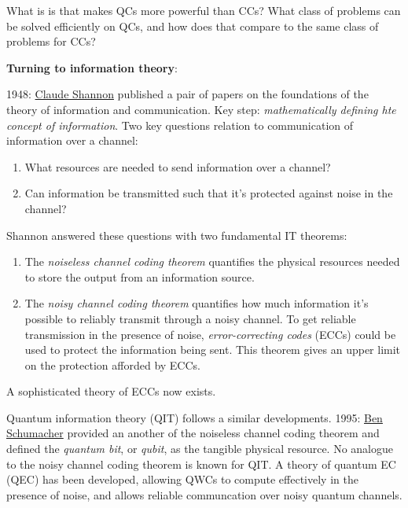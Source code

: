\documentclass{article}
\begin{document}
What is is that makes QCs more powerful than CCs? What class of problems can be solved efficiently on QCs, and how does that compare to the same class of problems for CCs?

\textbf{Turning to information theory}:

1948: \href{https://en.wikipedia.org/wiki/Claude_Shannon}{Claude Shannon} published a pair of papers on the foundations of the theory of information and communication. Key step: \textit{mathematically defining hte concept of information}. Two key questions relation to communication of information over a channel:

\begin{enumerate}
\item What resources are needed to send information over a channel?
\item Can information be transmitted such that it's protected against noise in the channel?
\end{enumerate}

Shannon answered these questions with two fundamental IT theorems:

\begin{enumerate}
\item The \textit{noiseless channel coding theorem} quantifies the physical resources needed to store the output from an information source.
\item The \textit{noisy channel coding theorem} quantifies how much information it's possible to reliably transmit through a noisy channel. To get reliable transmission in the presence of noise, \textit{error-correcting codes} (ECCs) could be used to protect the information being sent. This theorem gives an upper limit on the protection afforded by ECCs.
\end{enumerate}

A sophisticated theory of ECCs now exists.

Quantum information theory (QIT) follows a similar developments. 1995: \href{https://en.wikipedia.org/wiki/Benjamin_Schumacher}{Ben Schumacher} provided an another of the noiseless channel coding theorem and defined the \textit{quantum bit}, or \textit{qubit}, as the tangible physical resource. No analogue to the noisy channel coding theorem is known for QIT. A theory of quantum EC (QEC) has been developed, allowing QWCs to compute effectively in the presence of noise, and allows reliable communcation over noisy quantum channels.
\end{document}
